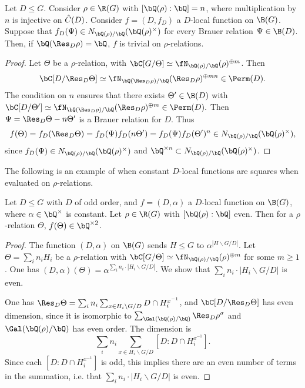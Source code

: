\begin{prop}\label{rational-res}
Let $D \leq G$. Consider $\rho \in \R(G)$ with $[\bQ(\rho) : \bQ] = n$, where multiplication by $n$ is injective on $\hat{C}(D)$. Consider $f = (D, f_D)$ a $D$-local function on $\B(G)$. 
Suppose that $f_D(\Psi) \in \fieldnorm{\rho}$ for every Brauer relation $\Psi \in \B(D)$.
Then, if $\bQ(\Res_D \rho) = \bQ$, $f$ is trivial on $\rho$-relations.
\end{prop}

\begin{proof}
    Let $\Theta$ be a $\rho$-relation, with $\bC[G / \Theta] \simeq \repnorm{\rho}^{\oplus m}$. Then $$\bC[D / \Res_D \Theta] \simeq \repnorm{\Res_D \rho}^{\oplus m n} \in \Perm(D).$$ 
    The condition on $n$ ensures that there exists $\Theta' \in \B(D)$ with $\bC[D / \Theta'] \simeq \repnorm{\Res_D \rho}^{\oplus m} \in \Perm(D).$ Then $\Psi = \Res_D\Theta - n\Theta'$ is a Brauer relation for $D$. Thus
    \[ f(\Theta) = f_D(\Res_D \Theta) = f_D(\Psi)f_D(n\Theta') = f_D(\Psi)f_D(\Theta')^n \in \fieldnorm{\rho}, \]
    since $f_D(\Psi) \in \fieldnorm{\rho}$ and $\bQ^{\times n} \subset \fieldnorm{\rho}$. 
\end{proof}

The following is an example of when constant $D$-local functions are squares when evaluated on $\rho$-relations.

\begin{prop}\label{const-fns}
     Let $D \leq G$ with $D$ of odd order, and $f = (D, \alpha)$ a $D$-local function on $\B(G)$, where $\alpha \in \bQ^{\times}$ is constant. Let $\rho \in \R(G)$ with $[\bQ(\rho) : \bQ ]$ even. Then for a $\rho$-relation $\Theta$, $f(\Theta) \in \bQ^{\times 2}$. 
\end{prop}

\begin{proof}
    The function $(D, \alpha)$ on $\B(G)$ sends $H \leq G$ to $\alpha^{| H \backslash G / D|}$. Let $\Theta = \sum_i n_i H_i$ be a $\rho$-relation with $\bC[G / \Theta] \simeq \repnorm{\rho}^{\oplus m}$ for some $m \geq 1$. One has $(D, \alpha)(\Theta) = \alpha^{\sum_i n_i \cdot | H_i \backslash G / D|}$. We show that $\sum_i n_i \cdot | H_i \backslash G / D |$ is even.

    One has $\Res_D \Theta = \sum_i n_i \sum_{x \in H_i \backslash G / D} D \cap H_i^{x^{-1}}$, and $\bC[D / \Res_D \Theta]$ has even dimension, since it is isomorphic to $\sum_{\Gal(\bQ(\rho) / \bQ)} \Res_D \rho^{\sigma}$ and $\Gal(\bQ(\rho) / \bQ)$ has even order. The dimension is $$\sum_i n_i \sum_{x \in H_i \backslash G / D} [D : D \cap H_i^{x^{-1}} ].$$ Since each $[D : D \cap H_i^{x^{-1}} ]$ is odd, this implies there are an even number of terms in the summation, i.e. that $\sum_i n_i \cdot | H_i \backslash G / D|$ is even. 

\end{proof}

